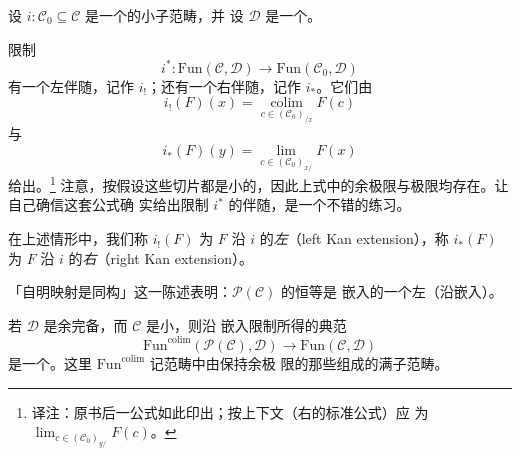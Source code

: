 设 $i\colon \mathcal{C}_0 \subseteq \mathcal{C}$ 是一个\trCategory{}的小子范畴，并
设 $\mathcal{D}$ 是一个\trBicomplete{}\trCategory{}。

\begin{fact}\label{fact:restriction-adjoints}
限制\trFunctor{}%
\[
i^*\colon \mathrm{Fun}(\mathcal{C},\mathcal{D}) \to
\mathrm{Fun}(\mathcal{C}_0,\mathcal{D})
\]
有一个左伴随，记作 $i_!$；还有一个右伴随，记作 $i_*$。它们由
\[
i_!(F)(x) = \operatorname*{colim}_{c \in (\mathcal{C}_0)_{/x}} F(c)
\]
与
\[
i_*(F)(y) = \operatorname*{lim}_{c \in (\mathcal{C}_0)_{x/}} F(x)
\]
给出。\footnote{译注：原书后一公式如此印出；按上下文（右\trKanExtension{}的标准公式）应
为 $\operatorname*{lim}_{c \in (\mathcal{C}_0)_{y/}} F(c)$。}
注意，按假设这些切片都是小的，因此上式中的余极限与极限均存在。让自己确信这套公式确
实给出限制\trFunctor{} $i^*$ 的伴随，是一个不错的练习。
\end{fact}

\begin{definition}\label{def:kan-extension}
在上述情形中，我们称 $i_!(F)$ 为 $F$ 沿 $i$ 的\emph{左\trKanExtension{}}（left Kan
extension），称 $i_*(F)$ 为 $F$ 沿 $i$ 的\emph{右\trKanExtension{}}（right Kan
extension）。
\end{definition}

\begin{observation}\label{obs:identity-kan-extension}
「自明映射是同构」这一陈述表明：$\mathcal{P}(\mathcal{C})$ 的恒等\trFunctor{}是\trYoneda{}%
嵌入的一个左\trKanExtension{}（沿\trYoneda{}嵌入）。
\end{observation}

\begin{corollary}\label{cor:colim-preserving-restriction-equivalence}
若 $\mathcal{D}$ 是余完备\trCategory{}，而 $\mathcal{C}$ 是小\trCategory{}，则沿%
\trYoneda{}嵌入限制所得的典范\trFunctor{}%
\[
\mathrm{Fun}^{\mathrm{colim}}(\mathcal{P}(\mathcal{C}), \mathcal{D}) \to
\mathrm{Fun}(\mathcal{C},\mathcal{D})
\]
是一个\trEquivalence{}。这里 $\mathrm{Fun}^{\mathrm{colim}}$ 记\trFunctor{}范畴中由保持余极
限的那些\trFunctor{}组成的满子范畴。
\end{corollary}

